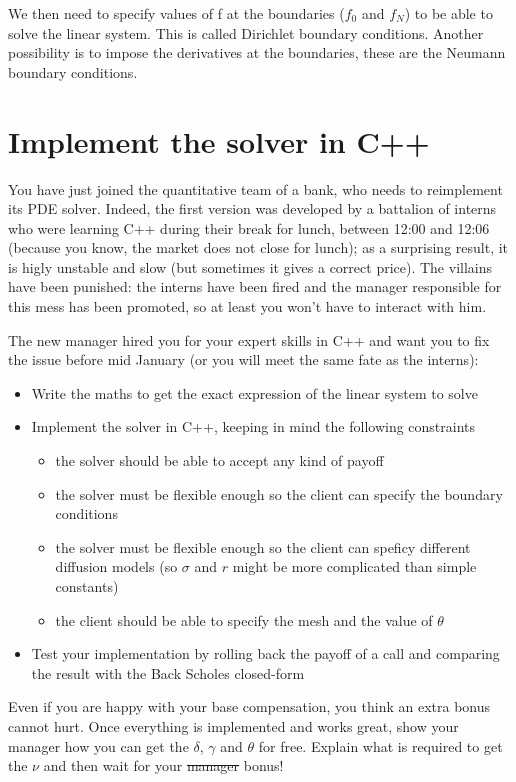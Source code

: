 \documentclass[a4paper]{article}
\begin{document}
We then need to specify values of f at the boundaries ($f_0$ and $f_N$) to be able to solve the linear system. This is called Dirichlet boundary conditions. Another possibility is to impose the derivatives at the boundaries, these are the Neumann boundary conditions.

\section{Implement the solver in C++}

You have just joined the quantitative team of a bank, who needs to reimplement its PDE solver. Indeed, the first version was developed by a battalion of
interns who were learning C++ during their break for lunch, between 12:00 and 12:06 (because you know, the market does not close for lunch); as a surprising result, it is higly unstable and slow (but sometimes it gives a correct price). The villains have been punished: the interns have been fired and the manager responsible for this mess has been promoted, so at least you won't have to interact with him.

The new manager hired you for your expert skills in C++ and want you to fix the issue before mid January (or you will meet the same fate as the interns):

\begin{itemize}
\item Write the maths to get the exact expression of the linear system to solve
\item Implement the solver in C++, keeping in mind the following constraints
\begin{itemize}
\item the solver should be able to accept any kind of payoff
\item the solver must be flexible enough so the client can specify the boundary conditions
\item the solver must be flexible enough so the client can speficy different diffusion models (so $\sigma$ and $r$ might be more complicated than simple constants)
\item the client should be able to specify the mesh and the value of $\theta$
\end{itemize}
\item Test your implementation by rolling back the payoff of a call and comparing the result with the Back Scholes closed-form
\end{itemize}

Even if you are happy with your base compensation, you think an extra bonus cannot hurt. Once everything is implemented and works great, show your
manager how you can get the $\delta$, $\gamma$ and $\theta$ for free. Explain what is required to get the $\nu$ and then wait for your \st{manager}
bonus!
\end{document}
